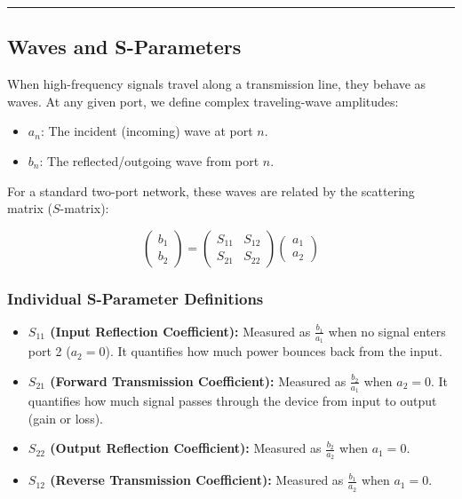 \documentclass[
]{article}
\providecommand{\tightlist}{%
  \setlength{\itemsep}{0pt}\setlength{\parskip}{0pt}}
\begin{document}
\begin{center}\rule{0.5\linewidth}{0.5pt}\end{center}

\subsection{Waves and S-Parameters}\label{waves-and-s-parameters}

When high-frequency signals travel along a transmission line, they
behave as waves. At any given port, we define complex traveling-wave
amplitudes:

\begin{itemize}
\tightlist
\item
  \(a_n\): The incident (incoming) wave at port \(n\).
\item
  \(b_n\): The reflected/outgoing wave from port \(n\).
\end{itemize}

For a standard two-port network, these waves are related by the
scattering matrix (\(S\)-matrix):

\[\begin{pmatrix} b_1 \\ b_2 \end{pmatrix} = \begin{pmatrix} S_{11} & S_{12} \\ S_{21} & S_{22} \end{pmatrix} \begin{pmatrix} a_1 \\ a_2 \end{pmatrix}\]

\subsubsection{Individual S-Parameter
Definitions}\label{individual-s-parameter-definitions}

\begin{itemize}
\tightlist
\item
  \textbf{\(S_{11}\) (Input Reflection Coefficient):} Measured as
  \(\frac{b_1}{a_1}\) when no signal enters port 2 (\(a_2 = 0\)). It
  quantifies how much power bounces back from the input.
\item
  \textbf{\(S_{21}\) (Forward Transmission Coefficient):} Measured as
  \(\frac{b_2}{a_1}\) when \(a_2 = 0\). It quantifies how much signal
  passes through the device from input to output (gain or loss).
\item
  \textbf{\(S_{22}\) (Output Reflection Coefficient):} Measured as
  \(\frac{b_2}{a_2}\) when \(a_1 = 0\).
\item
  \textbf{\(S_{12}\) (Reverse Transmission Coefficient):} Measured as
  \(\frac{b_1}{a_2}\) when \(a_1 = 0\).
\end{itemize}
\end{document}
